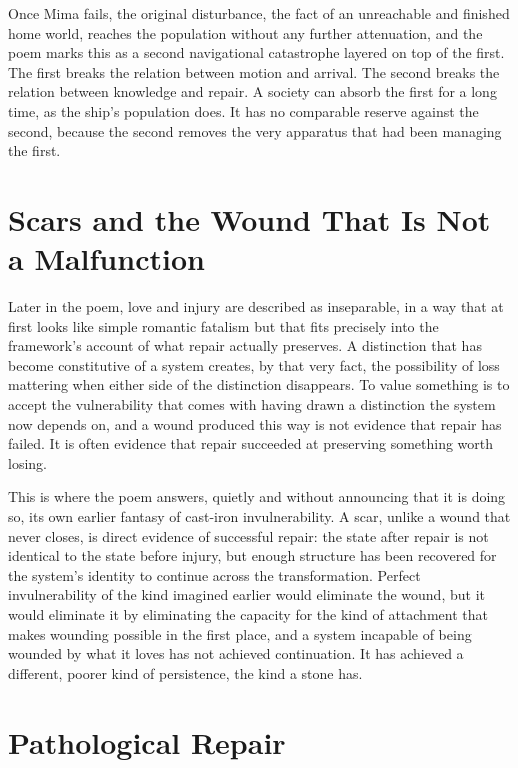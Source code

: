 \documentclass[11pt]{article}
\begin{document}
Once Mima fails, the original disturbance, the fact of an unreachable and finished home world, reaches the population without any further attenuation, and the poem marks this as a second navigational catastrophe layered on top of the first. The first breaks the relation between motion and arrival. The second breaks the relation between knowledge and repair. A society can absorb the first for a long time, as the ship's population does. It has no comparable reserve against the second, because the second removes the very apparatus that had been managing the first.

\section{Scars and the Wound That Is Not a Malfunction}

Later in the poem, love and injury are described as inseparable, in a way that at first looks like simple romantic fatalism but that fits precisely into the framework's account of what repair actually preserves. A distinction that has become constitutive of a system creates, by that very fact, the possibility of loss mattering when either side of the distinction disappears. To value something is to accept the vulnerability that comes with having drawn a distinction the system now depends on, and a wound produced this way is not evidence that repair has failed. It is often evidence that repair succeeded at preserving something worth losing.

This is where the poem answers, quietly and without announcing that it is doing so, its own earlier fantasy of cast-iron invulnerability. A scar, unlike a wound that never closes, is direct evidence of successful repair: the state after repair is not identical to the state before injury, but enough structure has been recovered for the system's identity to continue across the transformation. Perfect invulnerability of the kind imagined earlier would eliminate the wound, but it would eliminate it by eliminating the capacity for the kind of attachment that makes wounding possible in the first place, and a system incapable of being wounded by what it loves has not achieved continuation. It has achieved a different, poorer kind of persistence, the kind a stone has.

\section{Pathological Repair}
\end{document}

